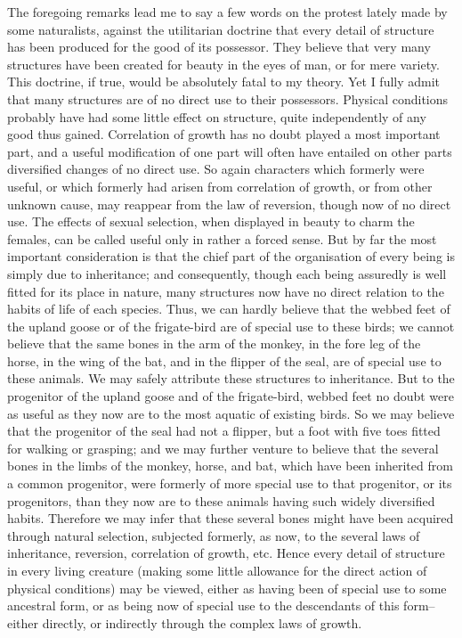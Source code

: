 The foregoing remarks lead me to say a few words on the protest lately made by some naturalists, against the utilitarian doctrine that every detail of structure has been produced for the good of its possessor. They believe that very many structures have been created for beauty in the eyes of man, or for mere variety. This doctrine, if true, would be absolutely fatal to my theory. Yet I fully admit that many structures are of no direct use to their possessors. Physical conditions probably have had some little effect on structure, quite independently of any good thus gained. Correlation of growth has no doubt played a most important part, and a useful modification of one part will often have entailed on other parts diversified changes of no direct use. So again characters which formerly were useful, or which formerly had arisen from correlation of growth, or from other unknown cause, may reappear from the law of reversion, though now of no direct use. The effects of sexual selection, when displayed in beauty to charm the females, can be called useful only in rather a forced sense. But by far the most important consideration is that the chief part of the organisation of every being is simply due to inheritance; and consequently, though each being assuredly is well fitted for its place in nature, many structures now have no direct relation to the habits of life of each species. Thus, we can hardly believe that the webbed feet of the upland goose or of the frigate-bird are of special use to these birds; we cannot believe that the same bones in the arm of the monkey, in the fore leg of the horse, in the wing of the bat, and in the flipper of the seal, are of special use to these animals. We may safely attribute these structures to inheritance. But to the progenitor of the upland goose and of the frigate-bird, webbed feet no doubt were as useful as they now are to the most aquatic of existing birds. So we may believe that the progenitor of the seal had not a flipper, but a foot with five toes fitted for walking or grasping; and we may further venture to believe that the several bones in the limbs of the monkey, horse, and bat, which have been inherited from a common progenitor, were formerly of more special use to that progenitor, or its progenitors, than they now are to these animals having such widely diversified habits. Therefore we may infer that these several bones might have been acquired through natural selection, subjected formerly, as now, to the several laws of inheritance, reversion, correlation of growth, etc. Hence every detail of structure in every living creature (making some little allowance for the direct action of physical conditions) may be viewed, either as having been of special use to some ancestral form, or as being now of special use to the descendants of this form--either directly, or indirectly through the complex laws of growth.
